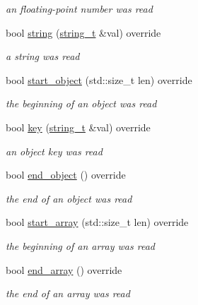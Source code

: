 \begin{DoxyCompactItemize}
\begin{DoxyCompactList}\small\item\em an floating-\/point number was read \end{DoxyCompactList}\item 
bool \mbox{\hyperlink{classnlohmann_1_1detail_1_1json__sax__dom__parser_a1c0e1e24fb803e358f63fcb5c1d1e4ee}{string}} (\mbox{\hyperlink{structnlohmann_1_1json__sax_ae01977a9f3c5b3667b7a2929ed91061e}{string\+\_\+t}} \&val) override
\begin{DoxyCompactList}\small\item\em a string was read \end{DoxyCompactList}\item 
bool \mbox{\hyperlink{classnlohmann_1_1detail_1_1json__sax__dom__parser_aa4b694ee448999880c567218778f5078}{start\+\_\+object}} (std\+::size\+\_\+t len) override
\begin{DoxyCompactList}\small\item\em the beginning of an object was read \end{DoxyCompactList}\item 
bool \mbox{\hyperlink{classnlohmann_1_1detail_1_1json__sax__dom__parser_a76014cffa8ce9c4bb4b25a538c5a3920}{key}} (\mbox{\hyperlink{structnlohmann_1_1json__sax_ae01977a9f3c5b3667b7a2929ed91061e}{string\+\_\+t}} \&val) override
\begin{DoxyCompactList}\small\item\em an object key was read \end{DoxyCompactList}\item 
bool \mbox{\hyperlink{classnlohmann_1_1detail_1_1json__sax__dom__parser_a0ed3d660d7d97411fdebeba233b4d994}{end\+\_\+object}} () override
\begin{DoxyCompactList}\small\item\em the end of an object was read \end{DoxyCompactList}\item 
bool \mbox{\hyperlink{classnlohmann_1_1detail_1_1json__sax__dom__parser_a888d06ee0dfe01a5e6acd92ad9e2804c}{start\+\_\+array}} (std\+::size\+\_\+t len) override
\begin{DoxyCompactList}\small\item\em the beginning of an array was read \end{DoxyCompactList}\item 
bool \mbox{\hyperlink{classnlohmann_1_1detail_1_1json__sax__dom__parser_aa6abf5a95889056d92d6af63a831b854}{end\+\_\+array}} () override
\begin{DoxyCompactList}\small\item\em the end of an array was read \end{DoxyCompactList}\item 

\end{DoxyCompactItemize}

